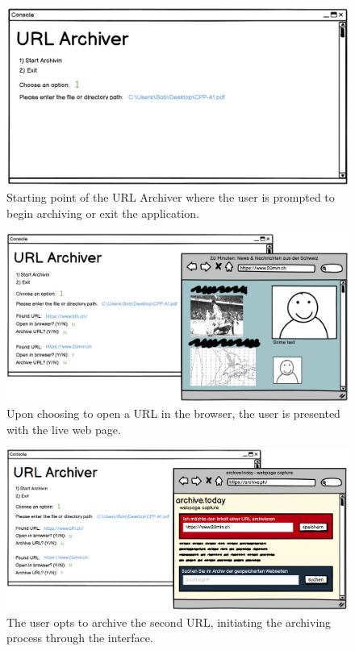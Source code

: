 \begin{figure}[h!]
    \centering
    \includegraphics[width=1\textwidth]{pictures/UX-Prototype/Prototype_1}
    \caption{Starting point of the URL Archiver where the user is prompted to begin archiving or exit the application.}
    \label{fig:Initial_Interface}
\end{figure}
\begin{figure}[h!]
    \centering
    \includegraphics[width=1\textwidth]{pictures/UX-Prototype/Prototype_2}
    \caption{Upon choosing to open a URL in the browser, the user is presented with the live web page.}
    \label{fig:URL_Discovery}
\end{figure}
\begin{figure}[h!]
    \centering
    \includegraphics[width=1\textwidth]{pictures/UX-Prototype/Prototype_3}
    \caption{The user opts to archive the second URL, initiating the archiving process through the interface.}
    \label{fig:Browser_Interaction}
\end{figure}
\clearpage

